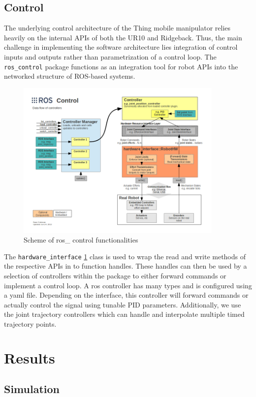 \documentclass[times, utf8, diplomski, english]{fer}
\begin{document}
\section{Control}\label{section:control}
The underlying control architecture of the Thing mobile manipulator relies heavily on the internal APIs of both the UR10 and Ridgeback.
Thus, the main challenge in implementing the software architecture lies integration of control inputs and outputs rather than parametrization of a control loop.
The \verb|ros_control| package functions as an integration tool for robot APIs into the networked structure of ROS-based systems.
\begin{figure}\label{fig:ros control}
\centering
\includegraphics[width=0.9\textwidth]{ros_control}
\caption{Scheme of ros\_ control functionalities}
\end{figure}
The \verb|hardware_interface| \ref{fig:ros control} class is used to wrap the read and write methods of the respective APIs in to function handles. 
These handles can then be used by a selection of controllers within the package to either forward commands or implement a control loop.
A ros controller has many types and is configured using a yaml file. 
Depending on the interface, this controller will forward commands or actually control the signal using tunable PID parameters.
Additionally, we use the joint trajectory controllers which can handle and interpolate multiple timed trajectory points.


\chapter{Results}
\section{Simulation}
\end{document}
